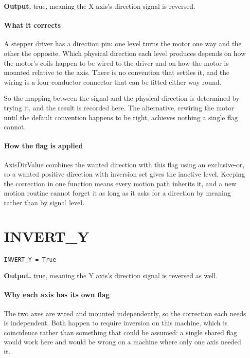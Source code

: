 \noindent\textbf{Output.} true, meaning the X axis's direction signal is reversed.


\paragraph{What it corrects}
A stepper driver has a direction pin: one level turns the motor one way and the other the opposite. Which physical direction each level produces depends on how the motor's coils happen to be wired to the driver and on how the motor is mounted relative to the axis. There is no convention that settles it, and the wiring is a four-conductor connector that can be fitted either way round.

So the mapping between the signal and the physical direction is determined by trying it, and the result is recorded here. The alternative, rewiring the motor until the default convention happens to be right, achieves nothing a single flag cannot.


\paragraph{How the flag is applied}
AxisDirValue combines the wanted direction with this flag using an exclusive-or, so a wanted positive direction with inversion set gives the inactive level. Keeping the correction in one function means every motion path inherits it, and a new motion routine cannot forget it as long as it asks for a direction by meaning rather than by signal level.


\section{INVERT\_Y}
\begin{lstlisting}[style=sig]
INVERT_Y = True
\end{lstlisting}

\noindent\textbf{Output.} true, meaning the Y axis's direction signal is reversed as well.


\paragraph{Why each axis has its own flag}
The two axes are wired and mounted independently, so the correction each needs is independent. Both happen to require inversion on this machine, which is coincidence rather than something that could be assumed: a single shared flag would work here and would be wrong on a machine where only one axis needed it.


